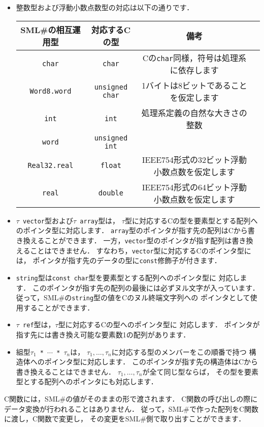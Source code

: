 \documentclass{jbook}
\newcommand{\smlsharp}{SML\#}
\begin{document}
\begin{itemize}
\item 整数型および浮動小数点数型の対応は以下の通りです．
\begin{center}
\begin{tabular}{|c|c|c|l|}
\hline
\smlsharp{}の相互運用型 & 対応するCの型 & 備考\\
\hline
{\tt char} & {\tt char} & Cの{\tt char}同様，符号は処理系に依存します\\
{\tt Word8.word} & {\tt unsigned char} & 1バイトは8ビットであることを仮定します\\
{\tt int} & {\tt int} & 処理系定義の自然な大きさの整数\\
{\tt word} & {\tt unsigned int} &\\
{\tt Real32.real} & {\tt float} & IEEE754形式の32ビット浮動小数点数を仮定します\\
{\tt real} & {\tt double} & IEEE754形式の64ビット浮動小数点数を仮定します\\
\hline
\end{tabular}
\end{center}
\item
	{\tt $\tau$ vector}型および{\tt $\tau$ array}型は，
$\tau$型に対応するCの型を要素型とする配列へのポインタ型に対応します．
	{\tt array}型のポインタが指す先の配列はCから書き換えることができます．
	一方，{\tt vector}型のポインタが指す配列は書き換えることはできません．
	すなわち，{\tt vector}型に対応するCのポインタ型には，
ポインタが指す先のデータの型に{\tt const}修飾子が付きます．
\item
	{\tt string}型は{\tt const char}型を要素型とする配列へのポインタ型に
対応します．
	このポインタが指す先の配列の最後には必ずヌル文字が入っています．
	従って，\smlsharp{}の{\tt string}型の値をCのヌル終端文字列への
ポインタとして使用することができます．
\item
	{\tt $\tau$ ref}型は，$\tau$型に対応するCの型へのポインタ型に
対応します．
	ポインタが指す先には書き換え可能な要素数1の配列があります．
\item
	組型{\tt $\tau_1$ * $\cdots$ * $\tau_n$}は，
$\tau_1,\ldots,\tau_n$に対応する型のメンバーをこの順番で持つ
構造体へのポインタ型に対応します．
	このポインタが指す先の構造体はCから書き換えることはできません．
        $\tau_1,\ldots,\tau_n$が全て同じ型ならば，
その型を要素型とする配列へのポインタにも対応します．
\end{itemize}
	C関数には，\smlsharp{}の値がそのままの形で渡されます．
	C関数の呼び出しの際にデータ変換が行われることはありません．
	従って，\smlsharp{}で作った配列をC関数に渡し，C関数で変更し，
その変更を\smlsharp{}側で取り出すことができます．
\end{document}
